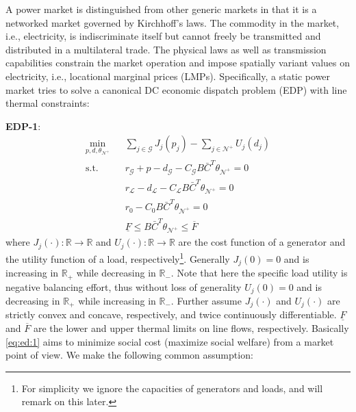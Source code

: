 \documentclass[journal,12pt,onecolumn,draftclsnofoot]{IEEEtran}
\begin{document}
A power market is distinguished from other generic markets in that it is a networked market governed by Kirchhoff's laws. The commodity in the market, i.e., electricity, is indiscriminate itself but cannot freely be transmitted and distributed in a multilateral trade. The physical laws as well as transmission capabilities constrain the market operation and impose spatially variant values on electricity, i.e., locational marginal prices (LMPs). Specifically, a static power market tries to solve a canonical DC economic dispatch problem (EDP) with line thermal constraints:

\noindent
\textbf{EDP-1}:
\begin{subequations}
	\begin{eqnarray}
	\label{eq:ed:1}
	 \min_{p,d, \theta_{\mathcal{N}^+}} &&   \sum_{j\in\mathcal{G}} J_j(p_j)  -  \sum_{j\in\mathcal{N}^+} U_j(d_j)   \\
	 	\label{eq:ed:2}
	 \mathrm{s.t.} &&   r_\mathcal{G} +p  - d_\mathcal{G}    - C_{\mathcal{G}}  B\bar C^T \theta_{\mathcal{N}^+} =0\\
	 	\label{eq:ed:3}
	 &&  r_{\mathcal{L}} - d_{\mathcal{L}}  - C_{\mathcal{L}}  B\bar C^T \theta_{\mathcal{N}^+}= 0  \\
	 	\label{eq:ed:4}	 
	 && r_0  - C_0 B \bar C^T\theta_{\mathcal{N}^+} =0\\
	 	\label{eq:ed:5}
	 &&   \underline{F} \le  B\bar C^T \theta_{\mathcal{N}^+}  \le  \overline{F} 
	\end{eqnarray}	\label{eq:ed}%
\end{subequations}
where $J_j(\cdot): \mathbb{R} \rightarrow \mathbb{R}$ and $U_j(\cdot): \mathbb{R} \rightarrow \mathbb{R}$ are the cost function of a generator and the utility function of a load, respectively\footnote{For simplicity we ignore the capacities of generators and loads, and will remark on this later.}. Generally $J_j(0)=0$ and is increasing in $\mathbb{R}_+$ while decreasing in $\mathbb{R}_-$. Note that here the specific load utility is negative balancing effort, thus without loss of generality $U_j(0)=0$ and is decreasing in $\mathbb{R}_+$ while increasing in $\mathbb{R}_-$.   Further assume $J_j(\cdot)$ and $U_j(\cdot)$ are strictly convex and concave, respectively, and twice continuously differentiable.
$\underline{F}$ and $\overline{F}$ are the lower and upper thermal limits on line flows, respectively. Basically \eqref{eq:ed:1} aims to minimize social cost (maximize social welfare) from a market point of view. We make the following common assumption:
\end{document}
